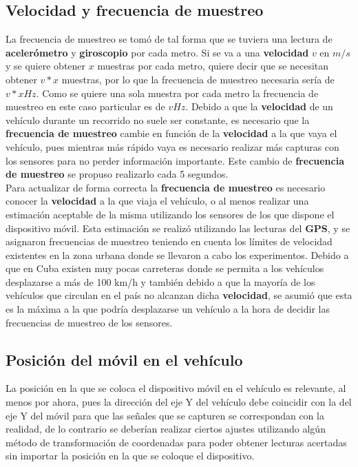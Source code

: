	\subsection{Velocidad y frecuencia de muestreo}
		La frecuencia de muestreo se tomó de tal forma que se tuviera una lectura de \textbf{acelerómetro} y \textbf
		{giroscopio} por cada metro. Si se va a una \textbf{velocidad} $v$ en $m/s$ y se quiere obtener $x$ muestras
		por cada metro, quiere decir que se necesitan obtener $v * x$ muestras, por lo que la frecuencia de muestreo
		necesaria sería de $v * x Hz$. Como se quiere una sola muestra por cada metro la frecuencia de muestreo
		en este caso particular es de $v Hz$. Debido a que la \textbf{velocidad} de un vehículo durante un
		recorrido no suele ser constante, es necesario que la \textbf{frecuencia de muestreo} cambie en función de la
		\textbf{velocidad} a la que vaya el vehículo, pues mientras más rápido vaya es necesario realizar más capturas
		con los sensores para no perder información importante. Este cambio de \textbf{frecuencia de muestreo} se propuso
		realizarlo cada 5 segundos.\\
		Para actualizar de forma correcta la \textbf{frecuencia de muestreo} es necesario conocer la \textbf{velocidad}
		a la que viaja el vehículo, o al menos realizar una estimación aceptable de la misma utilizando los sensores de
		los que dispone el dispositivo móvil. Esta estimación se realizó utilizando las lecturas del \textbf{GPS}, y se 
		asignaron frecuencias de muestreo teniendo en cuenta los límites de velocidad existentes en la zona urbana donde 
		se llevaron a cabo los experimentos. Debido a que en Cuba existen muy pocas carreteras donde se permita a
		los vehículos desplazarse a más de 100 km/h y también debido a que la mayoría de los vehículos que circulan en
		el país no alcanzan dicha \textbf{velocidad}, se asumió que esta es la máxima a la que podría desplazarse un
		vehículo a la hora de decidir las frecuencias de muestreo de los sensores.\\

	\subsection{Posición del móvil en el vehículo}
		La posición en la que se coloca el dispositivo móvil en el vehículo es relevante, al menos por ahora, pues la
		dirección del eje Y del vehículo debe coincidir con la del eje Y del móvil para que las señales que se capturen
		se correspondan con la realidad, de lo contrario se deberían realizar ciertos ajustes utilizando algún método de
		transformación de coordenadas para poder obtener lecturas acertadas sin importar la posición en la que se coloque
		el dispositivo.

